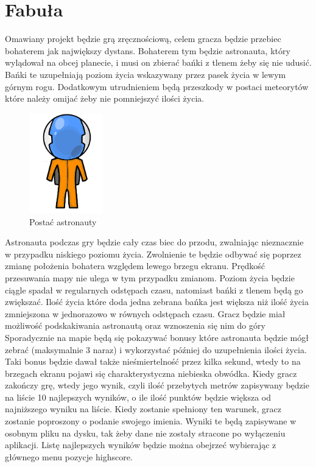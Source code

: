\section{Fabuła}

\hspace{1cm} Omawiany projekt będzie grą zręcznościową, celem gracza będzie przebiec bohaterem jak największy dystans. Bohaterem tym będzie astronauta, który wylądował na obcej planecie, i musi on zbierać bańki z tlenem żeby się nie udusić. Bańki te uzupełniają poziom życia wskazywany przez pasek życia w lewym górnym rogu. Dodatkowym utrudnieniem będą przeszkody w postaci meteorytów które należy omijać żeby nie pomniejszyć ilości życia.

 
\begin{figure}
\begin{center}
\includegraphics[width=120px]{./Pictures/astro.jpg}
\end{center}
\caption{Postać astronauty }
\label{Etykieta}
\end{figure}


Astronauta podczas gry będzie cały czas biec do przodu, zwalniając nieznacznie w przypadku niskiego poziomu życia. Zwolnienie te będzie odbywać się poprzez zmianę położenia bohatera względem lewego brzegu ekranu. Prędkość przesuwania mapy nie ulega w tym przypadku zmianom. Poziom życia będzie ciągle spadał w regularnych odstępach czasu, natomiast bańki z tlenem będą go zwiększać. Ilość życia które doda jedna zebrana bańka jest większa niż ilość życia zmniejszona w jednorazowo w równych odstępach czasu. Gracz będzie miał możliwość podskakiwania astronautą oraz wznoszenia się nim do góry Sporadycznie na mapie będą się pokazywać bonusy które astronauta będzie mógł zebrać (maksymalnie 3 naraz) i wykorzystać później do uzupełnienia ilości życia. Taki bonus 
będzie dawał także nieśmiertelność przez kilka sekund, wtedy to na brzegach ekranu pojawi się charakterystyczna niebieska obwódka. Kiedy gracz zakończy grę, wtedy jego wynik, czyli ilość przebytych metrów zapisywany będzie na liście 10 najlepszych wyników, o ile ilość punktów będzie większa od najniższego wyniku na liście. Kiedy zostanie spełniony ten warunek, gracz zostanie poproszony o podanie swojego imienia. Wyniki te będą zapisywane w osobnym pliku na dysku, tak żeby dane nie zostały stracone po wyłączeniu aplikacji. Listę najlepszych wyników będzie można obejrzeć wybierając z głównego menu pozycje highscore. 

